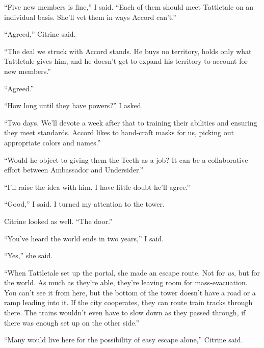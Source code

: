``Five new members is fine,'' I said.  ``Each of them should meet Tattletale on an individual basis.  She'll vet them in ways Accord can't.''



``Agreed,'' Citrine said.



``The deal we struck with Accord stands.  He buys no territory, holds only what Tattletale gives him, and he doesn't get to expand his territory to account for new members.''



``Agreed.''



``How long until they have powers?'' I asked.



``Two days.  We'll devote a week after that to training their abilities and ensuring they meet standards.  Accord likes to hand-craft masks for us, picking out appropriate colors and names.''



``Would he object to giving them the Teeth as a job?  It can be a collaborative effort between Ambassador and Undersider.''



``I'll raise the idea with him.  I have little doubt he'll agree.''



``Good,'' I said.  I turned my attention to the tower.



Citrine looked as well.  ``The door.''



``You've heard the world ends in two years,'' I said.



``Yes,'' she said.



``When Tattletale set up the portal, she made an escape route.  Not for \emph{us}, but for the world.  As much as they're able, they're leaving room for mass-evacuation.  You can't see it from here, but the bottom of the tower doesn't have a road or a ramp leading into it.  If the city cooperates, they can route train tracks through there.  The trains wouldn't even have to slow down as they passed through, if there was enough set up on the other side.''



``Many would live here for the possibility of easy escape alone,'' Citrine said.



